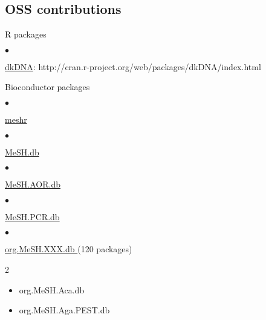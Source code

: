 \documentclass[margin,line,10pt]{res}
\newenvironment{list1}{
  \begin{list}{\ding{113}}{%
      \setlength{\itemsep}{0in}
      \setlength{\parsep}{0in} \setlength{\parskip}{0in}
      \setlength{\topsep}{0in} \setlength{\partopsep}{0in} 
      \setlength{\leftmargin}{0.17in}}}{\end{list}}
\newenvironment{list2}{
  \begin{list}{$\bullet$}{%
      \setlength{\itemsep}{0in}
      \setlength{\parsep}{0in} \setlength{\parskip}{0in}
      \setlength{\topsep}{0in} \setlength{\partopsep}{0in} 
      \setlength{\leftmargin}{0.2in}}}{\end{list}}
\begin{document}
\begin{resume}
\vspace{0.5cm}
\section{\sc OSS contributions} 
\begin{list1}
\item[] R packages
\begin{list2}
\item \textcolor{blue}{\href{http://cran.r-project.org/web/packages/dkDNA/index.html}{dkDNA}}: http://cran.r-project.org/web/packages/dkDNA/index.html
\end{list2}
\vspace{0.3cm}
\item[] Bioconductor packages
\begin{list2}
\item \textcolor{blue}{\href{http://bioconductor.org/packages/release/bioc/html/meshr.html}{meshr}}
\end{list2}
\vspace{0.3cm}
\begin{list2}
\item  \textcolor{blue}{\href{http://bioconductor.org/packages/release/data/annotation/html/MeSH.db.html}{MeSH.db}}
\end{list2}
\vspace{0.3cm}
\begin{list2}
\item \textcolor{blue}{\href{http://www.bioconductor.org/packages/release/data/annotation/html/MeSH.AOR.db.html}{MeSH.AOR.db}}
\end{list2}
\vspace{0.3cm}
\begin{list2}
\item \textcolor{blue}{\href{http://www.bioconductor.org/packages/release/data/annotation/html/MeSH.PCR.db.html}{MeSH.PCR.db}}
\end{list2}
\vspace{0.3cm}
\begin{list2}
\item \textcolor{blue}{\href{http://www.bioconductor.org/packages/release/data/annotation/}{org.MeSH.XXX.db }} (120 packages)
\end{list2}
\begin{multicols}{2}
\begin{itemize}
\item org.MeSH.Aca.db
\item org.MeSH.Aga.PEST.db

\end{itemize}
\end{multicols}
\end{list1}
\end{resume}
\end{document}
